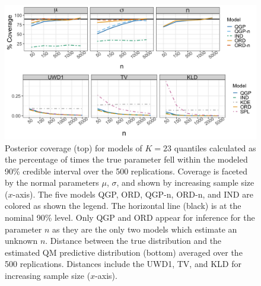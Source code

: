 \begin{figure}[hbt!]
  \centering
  \includegraphics[width=1\linewidth]{Images/normal_cover_dist.png}
\caption{Posterior coverage (top) for models of $K = 23$ quantiles
calculated as the percentage of times the 
true parameter fell within the modeled 90\% credible interval over the 500 
replications. Coverage is faceted by the normal parameters $\mu$, $\sigma$,
and shown by increasing sample size 
($x$-axis). The five models QGP, ORD, QGP-n, ORD-n, and IND are colored as 
shown the legend. The horizontal line (black) is at the nominal 90\% level. 
Only QGP and ORD appear for inference for the parameter $n$ as they are the 
only two models which 
estimate an unknown $n$.
Distance between the true distribution and the estimated QM predictive 
distribution (bottom) averaged over the 500 replications. Distances include the 
UWD1, TV, and KLD for increasing sample 
size ($x$-axis).}
\label{fig:normal_cov_dists}
\end{figure}



